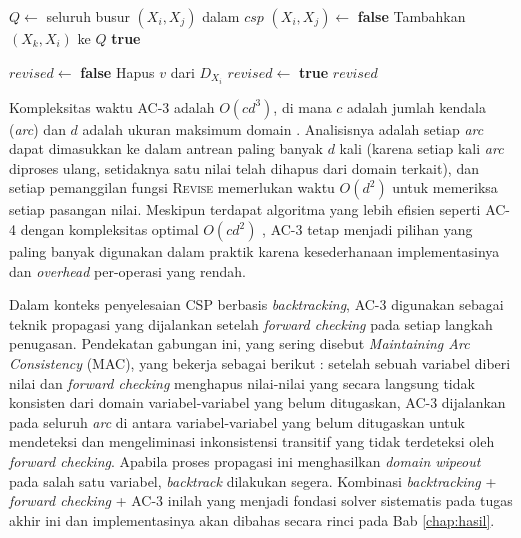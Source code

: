 \begin{algorithm}[H]
	\caption{Algoritma AC-3}
	\label{alg:ac3}
	\begin{algorithmic}[1]
		\State $Q \gets$ seluruh busur $(X_i, X_j)$ dalam $csp$
		\State $(X_i, X_j) \gets$ 
		\State \Return \textbf{false}
		\EndIf
		\State Tambahkan $(X_k, X_i)$ ke $Q$
		\EndFor
		\EndIf
		\EndWhile
		\State \Return \textbf{true}
		\EndFunction
		
		\vspace{0.5em}
		
		\State $revised \gets$ \textbf{false}
		\State Hapus $v$ dari $D_{X_i}$
		\State $revised \gets$ \textbf{true}
		\EndIf
		\EndFor
		\State \Return $revised$
		\EndFunction
	\end{algorithmic}
\end{algorithm}

Kompleksitas waktu AC-3 adalah $O(cd^3)$, di mana $c$ adalah jumlah kendala (\textit{arc}) dan $d$ adalah ukuran maksimum domain \cite{mackworth1977consistency}. Analisisnya adalah setiap \textit{arc} dapat dimasukkan ke dalam antrean paling banyak $d$ kali (karena setiap kali \textit{arc} diproses ulang, setidaknya satu nilai telah dihapus dari domain terkait), dan setiap pemanggilan fungsi \textsc{Revise} memerlukan waktu $O(d^2)$ untuk memeriksa setiap pasangan nilai. Meskipun terdapat algoritma yang lebih efisien seperti AC-4 dengan kompleksitas optimal $O(cd^2)$ \cite{mohr1986arc}, AC-3 tetap menjadi pilihan yang paling banyak digunakan dalam praktik karena kesederhanaan implementasinya dan \textit{overhead} per-operasi yang rendah.

Dalam konteks penyelesaian CSP berbasis \textit{backtracking}, AC-3 digunakan sebagai teknik propagasi yang dijalankan setelah \textit{forward checking} pada setiap langkah penugasan. Pendekatan gabungan ini, yang sering disebut \textit{Maintaining Arc Consistency} (MAC), yang bekerja sebagai berikut \cite{bessiere2006constraint}: setelah sebuah variabel diberi nilai dan \textit{forward checking} menghapus nilai-nilai yang secara langsung tidak konsisten dari domain variabel-variabel yang belum ditugaskan, AC-3 dijalankan pada seluruh \textit{arc} di antara variabel-variabel yang belum ditugaskan untuk mendeteksi dan mengeliminasi inkonsistensi transitif yang tidak terdeteksi oleh \textit{forward checking}. Apabila proses propagasi ini menghasilkan \textit{domain wipeout} pada salah satu variabel, \textit{backtrack} dilakukan segera. Kombinasi \textit{backtracking} + \textit{forward checking} + AC-3 inilah yang menjadi fondasi solver sistematis pada tugas akhir ini dan implementasinya akan dibahas secara rinci pada Bab \ref{chap:hasil}.

